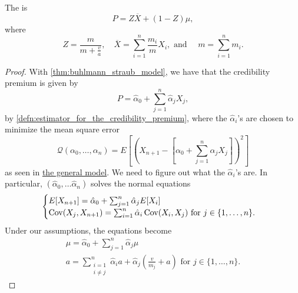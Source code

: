 \documentclass[notoc,notitlepage]{tufte-book}
\begin{document}
\begin{thm}\label{thm:buhlmann_straub_credibility_premium}
  The  is
  \begin{equation*}
    P = Z \overline{X} + (1 - Z)\mu,
  \end{equation*}
  where
  \begin{equation*}
    Z = \frac{m}{m + \frac{v}{a}}, \quad
    \overline{X} = \sum_{i=1}^{n} \frac{m_i}{m} X_i,\text{ and }\quad
    m = \sum_{i=1}^{n} m_i.
  \end{equation*}
\end{thm}

\begin{proof}
  With \cref{thm:buhlmann_straub_model}, we have
  that the credibility premium is given by
  \begin{equation*}
    P = \hat{\alpha}_0 + \sum_{j=1}^{n} \hat{\alpha}_j X_j,
  \end{equation*}
  by \cref{defn:estimator_for_the_credibility_premium},
  where the $\hat{\alpha}_i$'s are chosen to minimize the mean square error
  \begin{equation*}
    \mathcal{Q}(\alpha_0, \ldots, \alpha_n)
    = E \left[ \left( X_{n+1} - \left[ \alpha_0 + \sum_{j=1}^{n} \alpha_j X_j
      \right] \right)^2 \right]
  \end{equation*}
  as seen in
  \hyperref[thm:general_model_for_credibility_premium]{the general model}.
  We need to figure out what the $\hat{\alpha}_i$'s are.
  In particular, $(\hat{\alpha}_0, \ldots \hat{\alpha}_n)$
  solves the normal equations
  \begin{equation*}
    \begin{cases}
      E[X_{n+1}] = \hat{\alpha}_0 + \sum_{j=1}^{n} \hat{\alpha}_j E[X_i] \\
      \operatorname{Cov}(X_j, X_{n+1}) = \sum_{i=1}^{n} \hat{\alpha}_i \operatorname{Cov}(X_i, X_j) \text{
      for } j \in \{ 1, \ldots, n \}.
    \end{cases}
  \end{equation*}
  Under our assumptions, the equations become
  \begin{gather}
    \mu = \hat{\alpha}_0 + \sum_{j=1}^{n} \hat{\alpha}_j \mu  \tag{$\dagger$}\\
    a = \sum\limits_{\substack{i=1 \\ i \neq j}}^{n}
      \hat{\alpha}_i a + \hat{\alpha}_j \left( \frac{v}{m_j} + a \right)
      \text{ for } j \in \{ 1, \ldots, n \}. \tag{$*$}

\end{gather}
\end{proof}
\end{document}
